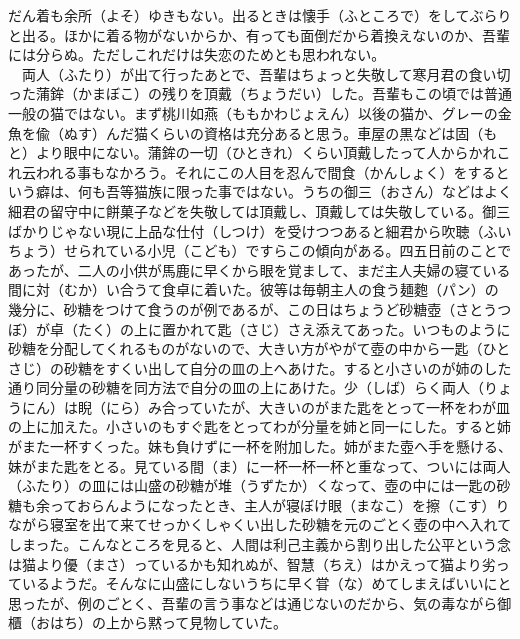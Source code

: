 だん着も余所（よそ）ゆきもない。出るときは懐手（ふところで）をしてぶらりと出る。ほかに着る物がないからか、有っても面倒だから着換えないのか、吾輩には分らぬ。ただしこれだけは失恋のためとも思われない。\\
　両人（ふたり）が出て行ったあとで、吾輩はちょっと失敬して寒月君の食い切った蒲鉾（かまぼこ）の残りを頂戴（ちょうだい）した。吾輩もこの頃では普通一般の猫ではない。まず桃川如燕（ももかわじょえん）以後の猫か、グレーの金魚を偸（ぬす）んだ猫くらいの資格は充分あると思う。車屋の黒などは固（もと）より眼中にない。蒲鉾の一切（ひときれ）くらい頂戴したって人からかれこれ云われる事もなかろう。それにこの人目を忍んで間食（かんしょく）をするという癖は、何も吾等猫族に限った事ではない。うちの御三（おさん）などはよく細君の留守中に餅菓子などを失敬しては頂戴し、頂戴しては失敬している。御三ばかりじゃない現に上品な仕付（しつけ）を受けつつあると細君から吹聴（ふいちょう）せられている小児（こども）ですらこの傾向がある。四五日前のことであったが、二人の小供が馬鹿に早くから眼を覚まして、まだ主人夫婦の寝ている間に対（むか）い合うて食卓に着いた。彼等は毎朝主人の食う麺麭（パン）の幾分に、砂糖をつけて食うのが例であるが、この日はちょうど砂糖壺（さとうつぼ）が卓（たく）の上に置かれて匙（さじ）さえ添えてあった。いつものように砂糖を分配してくれるものがないので、大きい方がやがて壺の中から一匙（ひとさじ）の砂糖をすくい出して自分の皿の上へあけた。すると小さいのが姉のした通り同分量の砂糖を同方法で自分の皿の上にあけた。少（しば）らく両人（りょうにん）は睨（にら）み合っていたが、大きいのがまた匙をとって一杯をわが皿の上に加えた。小さいのもすぐ匙をとってわが分量を姉と同一にした。すると姉がまた一杯すくった。妹も負けずに一杯を附加した。姉がまた壺へ手を懸ける、妹がまた匙をとる。見ている間（ま）に一杯一杯一杯と重なって、ついには両人（ふたり）の皿には山盛の砂糖が堆（うずたか）くなって、壺の中には一匙の砂糖も余っておらんようになったとき、主人が寝ぼけ眼（まなこ）を擦（こす）りながら寝室を出て来てせっかくしゃくい出した砂糖を元のごとく壺の中へ入れてしまった。こんなところを見ると、人間は利己主義から割り出した公平という念は猫より優（まさ）っているかも知れぬが、智慧（ちえ）はかえって猫より劣っているようだ。そんなに山盛にしないうちに早く甞（な）めてしまえばいいにと思ったが、例のごとく、吾輩の言う事などは通じないのだから、気の毒ながら御櫃（おはち）の上から黙って見物していた。\\
